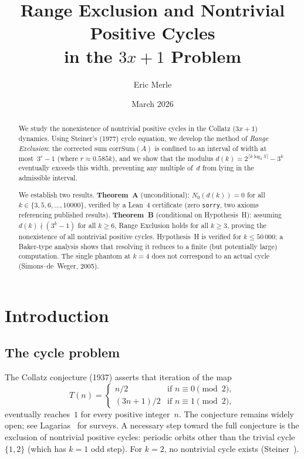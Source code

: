 \documentclass[11pt, a4paper]{amsart}
\title[Range Exclusion for Collatz cycles]{%
  Range Exclusion and Nontrivial Positive Cycles\\
  in the $3x{+}1$ Problem}
\author{Eric Merle}
\date{March 2026}
\theoremstyle{plain}
\theoremstyle{definition}
\theoremstyle{remark}
\newcommand{\corrSum}{\mathrm{corrSum}}
\begin{document}
\begin{abstract}
We study the nonexistence of nontrivial positive cycles in the Collatz
($3x{+}1$) dynamics.  Using Steiner's (1977) cycle equation, we
develop the method of \emph{Range Exclusion}: the corrected sum
$\corrSum(A)$ is confined to an interval of width at most~$3^r - 1$
(where $r \approx 0.585k$), and we show that the modulus
$d(k) = 2^{\lceil k\log_2 3\rceil} - 3^k$ eventually exceeds
this width, preventing any multiple of~$d$ from lying in the
admissible interval.

We establish two results.
\textbf{Theorem~A} (unconditional): $N_0(d(k)) = 0$
for all $k \in \{3, 5, 6, \ldots, 10000\}$,
verified by a Lean~4 certificate (zero \texttt{sorry},
two axioms referencing published results).
\textbf{Theorem~B} (conditional on Hypothesis~H):
assuming $d(k) \nmid (3^k - 1)$ for all $k \geq 6$,
Range Exclusion holds for all $k \geq 3$, proving the
nonexistence of all nontrivial positive cycles.
Hypothesis~H is verified for $k \leq 50\,000$;
a Baker-type analysis shows that resolving it
reduces to a finite (but potentially large) computation.
The single phantom at $k = 4$ does not correspond to an
actual cycle (Simons--de~Weger, 2005).
\end{abstract}

\maketitle
\tableofcontents

\section{Introduction}\label{sec:intro}

\subsection{The cycle problem}\label{ssec:cycle-problem}

The Collatz conjecture (1937) asserts that iteration of the map
\begin{equation}\label{eq:collatz}
  T(n) = \begin{cases}
    n/2       & \text{if } n \equiv 0 \pmod{2}, \\
    (3n+1)/2  & \text{if } n \equiv 1 \pmod{2},
  \end{cases}
\end{equation}
eventually reaches~$1$ for every positive integer~$n$.
The conjecture remains widely open; see
Lagarias~\cite{Lagarias1985,Lagarias2010} for surveys.
A necessary step toward the full conjecture is the exclusion
of nontrivial positive cycles: periodic orbits other than
the trivial cycle $\{1, 2\}$ (which has $k = 1$ odd step).
For $k = 2$, no nontrivial cycle exists
(Steiner~\cite{Steiner1977}).
\end{document}
